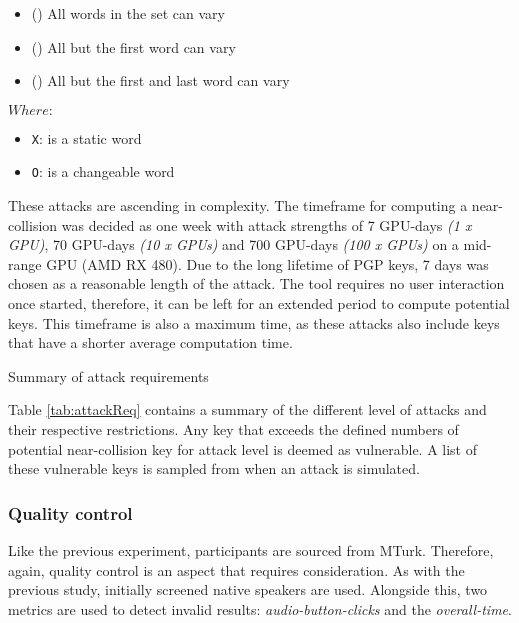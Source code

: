 \begin{itemize}
    \item (\OOOO) All words in the set can vary             
    \item (\XOOO) All but the first word can vary           
    \item (\XOOX) All but the first and last word can vary  
\end{itemize}

$Where: $
\begin{itemize}
    \item[] \verb|X|: is a static word
    \item[] \verb|O|: is a changeable word
\end{itemize}

These attacks are ascending in complexity. The timeframe for computing a near-collision was decided as one week with attack strengths of 7 GPU-days \textit{(1 x GPU)}, 70 GPU-days \textit{(10 x GPUs)} and 700 GPU-days \textit{(100 x GPUs)} on a mid-range GPU (AMD RX 480). Due to the long lifetime of PGP keys, 7 days was chosen as a reasonable length of the attack. The tool requires no user interaction once started, therefore, it can be left for an extended period to compute potential keys. This timeframe is also a maximum time, as these attacks also include keys that have a shorter average computation time.

\begin{table}[h!]
    \centering
    \begin{adjustbox}{width=0.5\textwidth,center}
        
    \end{adjustbox}
    \caption{Summary of attack requirements}
    \label{tab:attackReq}
\end{table}

Table \ref{tab:attackReq} contains a summary of the different level of attacks and their respective restrictions. Any key that exceeds the defined numbers of potential near-collision key for attack level is deemed as vulnerable. A list of these vulnerable keys is sampled from when an attack is simulated.

\subsubsection*{Quality control}
\label{sec:exp2_quality}
Like the previous experiment, participants are sourced from MTurk. Therefore, again, quality control is an aspect that requires consideration. As with the previous study, initially screened native speakers are used. Alongside this, two metrics are used to detect invalid results: \textit{audio-button-clicks} and the \textit{overall-time}. 

